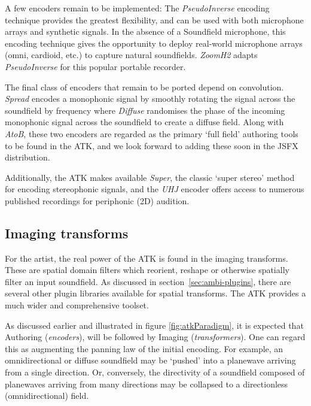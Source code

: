 \documentclass{article}
\begin{document}
A few encoders remain to be implemented:
The \emph{PseudoInverse} encoding technique provides the greatest flexibility, and can be used with both microphone arrays and synthetic signals. 
In the absence of a Soundfield microphone, this encoding technique gives the opportunity to deploy real-world microphone arrays (omni, cardioid, etc.) to capture natural soundfields.
\emph{Zoom\-H2} adapts \emph{PseudoInverse} for this popular portable recorder.

The final class of encoders that remain to be ported depend on convolution.
\emph{Spread} encodes a monophonic signal by smoothly rotating the signal across the soundfield by frequency where \emph{Diffuse} randomises the phase of the incoming monophonic signal across the soundfield to create a diffuse field.
Along with \emph{AtoB}, these two encoders are regarded as the primary `full field' authoring tools to be found in the ATK, and we look forward to adding these soon in the JSFX distribution.

Additionally, the ATK makes available \emph{Super}, the classic `super stereo' method for encoding stereophonic signals, and the \emph{UHJ} encoder offers access to numerous published recordings for periphonic (2D) audition.


\subsection{Imaging transforms}\label{sec:transforms}

For the artist, the real power of the ATK is found in the imaging transforms.
These are spatial domain filters which reorient, reshape or otherwise spatially filter an input soundfield.
As discussed in section~\ref{sec:ambi-plugins}, there are several other plugin libraries available for spatial transforms.
The ATK provides a much wider and comprehensive toolset.

As discussed earlier and illustrated in figure \ref{fig:atkParadigm}, it is expected that Authoring (\emph{encoders}), will be followed by Imaging (\emph{transformers}).
One can regard this as augmenting the panning law of the initial encoding. For example, an omni\-directional or diffuse soundfield may be `pushed' into a planewave arriving from a single direction.
Or, conversely, the directivity of a soundfield composed of planewaves arriving from many directions may be collapsed to a direct\-ionless (omnidirectional) field.
\end{document}
